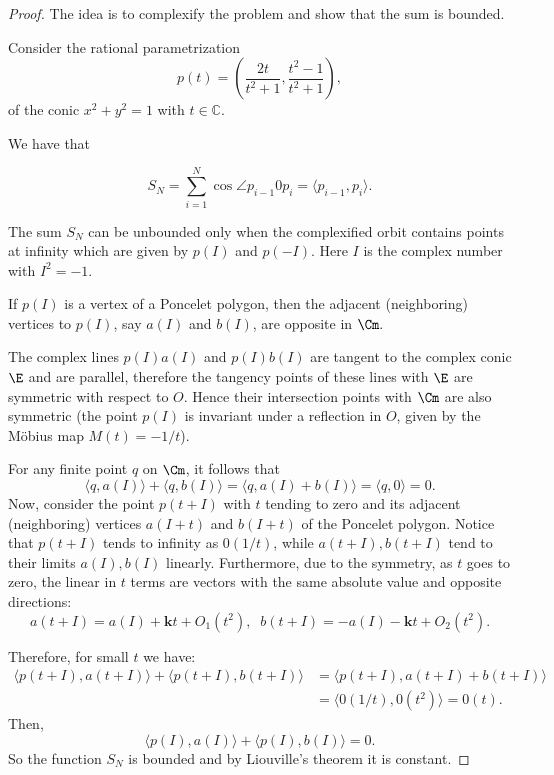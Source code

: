 \begin{proof} The idea is to complexify the problem and show that the sum is bounded.  

Consider the rational parametrization 
\[ p(t)=\left(\frac{2t}{t^2+1},\frac{t^2-1}{t^2+1}\right),\] 
of the conic $x^2+y^2=1 $ with $t\in\mathbb{C}$.

We have that

\[S_N=\sum_{i=1}^N \cos\angle p_{i-1}0p_{i}=\langle p_{i-1}, p_i\rangle. \]

The sum $S_N$ can be unbounded only when the complexified orbit contains   points  at infinity which are given by $p(I)$ and $p(-I)$. Here $I$ is the complex number with $I^2=-1.$

 If $p(I)$ is a vertex of a Poncelet polygon, then the adjacent (neighboring) vertices to $p(I)$, say $a(I)$ and $b(I)$, are opposite in $\Cm.$

The complex lines $p(I)a(I)$ and $p(I)b(I)$ are tangent to the complex conic $\E$ and are parallel, therefore the tangency points of these lines with $\E$ are symmetric with respect to $O$. Hence their intersection points with $\Cm$ are also symmetric (the point $p(I)$ is invariant under a reflection in $O$, given by the Möbius map $M(t)=-1/t$).

  For any finite point $q$   on $\Cm$, it follows that
 \[ \langle  q, a(I)\rangle +\langle q, b(I)\rangle  =  \langle  q, a(I)+b(I)     \rangle=\langle q,0\rangle=
0.\]
 Now, consider the point $p(t +I)$ with $t$  tending to zero and its adjacent (neighboring) vertices
$a(I +t)$ and $ b(I +t)$ of the Poncelet polygon. Notice that $   p(t + I) $ tends to infinity as
$0(1/t)$, while $a(t + I), b(t + I)$ tend to their limits $a(I), b(I)$ linearly. Furthermore,
due to the symmetry, as $t$ goes to zero, the linear in $t$ terms are vectors with the same
absolute value and opposite directions:
\[a(t+I)=a(I)+\mathbf{k} t+O_1(t^2),\;\;b(t+I)=-a(I)-\mathbf{k} t+O_2(t^2).\]

\noindent Therefore, for small $t$ we have:
\begin{align*}
\langle p(t + I ), a(t + I )\rangle + \langle p(t + I ), b(t + I )\rangle & = \langle p(t + I ), a(t + I ) + b(t + I )\rangle\\
&= \langle 0(1/t),0(t^2)\rangle = 0(t).
\end{align*}
Then,
 \[ \langle  p(I), a(I)\rangle +\langle p(I), b(I)\rangle  =   
0.\]
So the function $S_N$ is bounded and by Liouville's theorem it is constant.
\end{proof}

